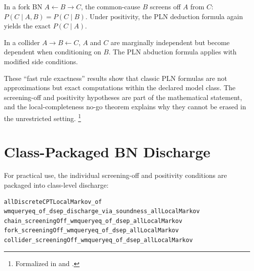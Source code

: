 \documentclass[11pt,openany]{report}
\begin{document}
\begin{theorem}
\label{thm:fork-exact}
In a fork BN $A \leftarrow B \to C$, the common-cause $B$ screens off
$A$ from $C$: $P(C \mid A, B) = P(C \mid B)$.  Under positivity, the
PLN deduction formula again yields the exact $P(C \mid A)$.
\end{theorem}

\begin{theorem}
In a collider $A \to B \leftarrow C$, $A$ and $C$ are marginally
independent but become dependent when conditioning on $B$.  The PLN
abduction formula applies with modified side conditions.
\end{theorem}

These ``fast rule exactness'' results show that classic PLN formulas are
not approximations but exact computations within the declared model class.
The screening-off and positivity hypotheses are part of the mathematical
statement, and the local-completeness no-go theorem explains why they
cannot be erased in the unrestricted setting.%
\footnote{Formalized in  and
  .}


\section{Class-Packaged BN Discharge}

For practical use, the individual screening-off and positivity conditions
are packaged into class-level discharge:
\begin{lstlisting}
allDiscreteCPTLocalMarkov_of
wmqueryeq_of_dsep_discharge_via_soundness_allLocalMarkov
chain_screeningOff_wmqueryeq_of_dsep_allLocalMarkov
fork_screeningOff_wmqueryeq_of_dsep_allLocalMarkov
collider_screeningOff_wmqueryeq_of_dsep_allLocalMarkov
\end{lstlisting}
\end{document}
